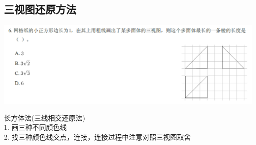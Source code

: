 \documentclass[hyperref, UTF8,11pt,a4paper]{ctexart} %
\begin{document}
\subsection{三视图还原方法}
\begin{center}
	\includegraphics[width=500pt]  {pic/litijihe/sanshituti.png} \\
\end{center}
{ \color{blue}  长方体法(三线相交还原法) \\
1. 画三种不同颜色线 \\
2. 找三种颜色线交点，连接，连接过程中注意对照三视图取舍 \\

}
\begin{center}

\end{center}
\end{document}
